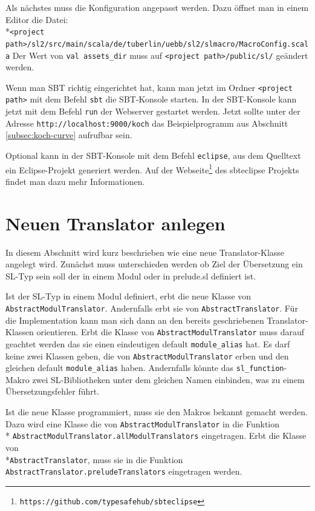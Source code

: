 \documentclass[12pt,bibtotoc]{scrreprt}
\begin{document}
Als nächstes muss die Konfiguration angepasst werden. Dazu öffnet man in einem Editor die Datei: \\*\lstinline!<project path>/sl2/src/main/scala/de/tuberlin/uebb/sl2/slmacro/MacroConfig.scala! Der Wert von \lstinline!val assets_dir! muss auf \lstinline!<project path>/public/sl/! geändert werden.

Wenn man SBT richtig eingerichtet hat, kann man jetzt im Ordner \lstinline!<project path>! mit dem Befehl \lstinline!sbt! die SBT-Konsole starten. In der SBT-Konsole kann jetzt mit dem Befehl \lstinline!run! der Webserver gestartet werden. Jetzt sollte unter der Adresse \lstinline!http://localhost:9000/koch! das Beispielprogramm aus Abschnitt \ref{subsec:koch-curve} aufrufbar sein.

Optional kann in der SBT-Konsole mit dem Befehl \lstinline!eclipse!, aus dem Quelltext ein Eclipse-Projekt generiert werden. Auf der Webseite\footnote{\lstinline!https://github.com/typesafehub/sbteclipse!} des sbteclipse Projekts findet man dazu mehr Informationen.


\section{Neuen Translator anlegen}
\label{sec:new-translator-class}

In diesem Abschnitt wird kurz beschrieben wie eine neue Translator-Klasse angelegt wird. Zunächst muss unterschieden werden ob Ziel der Übersetzung ein SL-Typ sein soll der in einem Modul oder in prelude.sl definiert ist. 

Ist der SL-Typ in einem Modul definiert, erbt die neue Klasse von \lstinline!AbstractModulTranslator!. Andernfalls erbt sie von \lstinline!AbstractTranslator!. Für die Implementation kann man sich dann an den bereits geschriebenen Translator-Klassen orientieren. Erbt die Klasse von \lstinline!AbstractModulTranslator! muss darauf geachtet werden das sie einen eindeutigen default \lstinline!module_alias! hat. Es darf keine zwei Klassen geben, die von \lstinline!AbstractModulTranslator! erben und den gleichen default \lstinline!module_alias! haben. Andernfalls könnte das \lstinline!sl_function!-Makro zwei SL-Bibliotheken unter dem gleichen Namen einbinden, was zu einem Übersetzungsfehler führt. 

Ist die neue Klasse programmiert, muss sie den Makros bekannt gemacht werden. Dazu wird eine Klasse die von \lstinline!AbstractModulTranslator! in die Funktion\\* \lstinline!AbstractModulTranslator.allModulTranslators! eingetragen. Erbt die Klasse von \\*\lstinline!AbstractTranslator!, muss sie in die Funktion \lstinline!AbstractTranslator.preludeTranslators! eingetragen werden.
\end{document}
